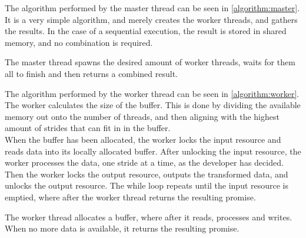 \documentclass[a4paper]{article}
\begin{document}
The algorithm performed by the master thread can be seen in \autoref{algorithm:master}. It is a very simple algorithm, and merely creates the worker threads, and gathers the results. In the case of a sequential execution, the result is stored in shared memory, and no combination is required. \\
 
\begin{algorithm}[H]
\noindent{} 
 \caption{The master thread spawns the desired amount of worker threads, waits for them all to finish and then returns a combined result.}
 \label{algorithm:master}
\end{algorithm}
\vspace{1\baselineskip}

The algorithm performed by the worker thread can be seen in \autoref{algorithm:worker}. The worker calculates the size of the buffer. This is done by dividing the available memory out onto the number of threads, and then aligning with the highest amount of strides that can fit in in the buffer.\\

When the buffer has been allocated, the worker locks the input resource and reads data into its locally allocated buffer. After unlocking the input resource, the worker processes the data, one stride at a time, as the developer has decided. Then the worker locks the output resource, outputs the transformed data, and unlocks the output resource. The while loop repeats until the input resource is emptied, where after the worker thread returns the resulting promise.

\begin{algorithm}[H]
\noindent{}
 \caption{The worker thread allocates a buffer, where after it reads, processes and writes. When no more data is available, it returns the resulting promise.}
 \label{algorithm:worker}
\end{algorithm}
\vspace{1\baselineskip}
\end{document}

